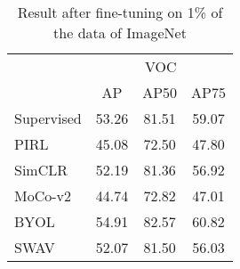 \begin{table}[H]
	\centering
	\begin{tabular}{l|ccc|}
		\cline{2-4}
		& \multicolumn{3}{c|}{VOC}                                                        \\ \cline{2-4} 
		& \multicolumn{1}{c|}{AP} & \multicolumn{1}{c|}{AP50} & \multicolumn{1}{c|}{AP75} \\ \hline
		\multicolumn{1}{|l|}{Supervised} & 53.26                   & 81.51                     & 59.07                     \\ \cline{1-1}
		\hline
		\multicolumn{1}{|l|}{PIRL}       & 45.08                   & 72.50                     & 47.80                     \\ \cline{1-1}
		\multicolumn{1}{|l|}{SimCLR}     & 52.19                   & 81.36                     & 56.92                     \\ \cline{1-1}
		\multicolumn{1}{|l|}{MoCo-v2}    & 44.74                   & 72.82                     & 47.01                     \\ \cline{1-1}
		\multicolumn{1}{|l|}{BYOL}       & 54.91                   & 82.57                     & 60.82                     \\ \cline{1-1}
		\multicolumn{1}{|l|}{SWAV}       & 52.07                   & 81.50                     & 56.03                     \\ \cline{1-1}
		\hline
	\end{tabular}
	\caption{Result after fine-tuning on 1\% of the data of ImageNet}
	\label{tab:object-detection}
\end{table}

\begin{comment}
\begin{table}[H]
	\centering
	\begin{tabular}{l|ccc|ccc|}
		\cline{2-7}
		& \multicolumn{3}{c|}{VOC (frozen)} & \multicolumn{3}{c|}{VOC (finetune)} \\ \cline{2-7} 
		& \multicolumn{1}{c}{AP} & \multicolumn{1}{c}{AP50} & \multicolumn{1}{c|}{AP75} & \multicolumn{1}{c}{AP} & \multicolumn{1}{c}{AP50} & \multicolumn{1}{c|}{AP75} \\ \hline
		\multicolumn{1}{|l|}{Supervised} & 51.99 & 81.53 & 56.21 & 53.26 & 81.51 & 59.07 \\ \hline
		\multicolumn{1}{|l|}{PIRL} & 49.54 & 77.26 & 52.79 & 45.08 & 72.50 & 47.80 \\ \cline{1-1}
		\multicolumn{1}{|l|}{SimCLR} & 51.94 & 81.19 & 56.49 & 52.19 & 81.36 & 56.92 \\ \cline{1-1}
		\multicolumn{1}{|l|}{MoCo-v2} & 54.22 & 81.86 & 59.97 & 44.74 & 72.82 & 47.01 \\ \cline{1-1}
		\multicolumn{1}{|l|}{BYOL} & 53.32 & 82.01 & 58.37 & 54.91 & 82.57 & 60.82 \\ \cline{1-1}
		\multicolumn{1}{|l|}{SWAV} & 50.68 & 80.82 & 54.11 & 52.07 & 81.50 & 56.03 \\ 
		\hline
	\end{tabular}
	\caption{Result after fine-tuning on 1\% of the data of ImageNet}
	\label{tab:object-detection-swav}
\end{table}
\end{comment}